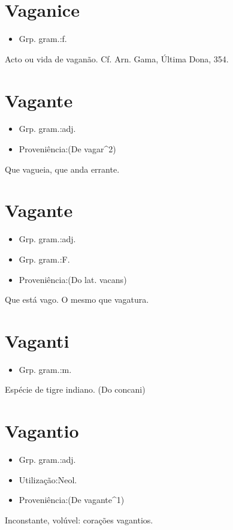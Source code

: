 \documentclass{article}
\begin{document}
\section{Vaganice}
\begin{itemize}
\item {Grp. gram.:f.}
\end{itemize}
Acto ou vida de vaganão. Cf. Arn. Gama, \textunderscore Última Dona\textunderscore , 354.
\section{Vagante}
\begin{itemize}
\item {Grp. gram.:adj.}
\end{itemize}
\begin{itemize}
\item {Proveniência:(De \textunderscore vagar\textunderscore ^2)}
\end{itemize}
Que vagueia, que anda errante.
\section{Vagante}
\begin{itemize}
\item {Grp. gram.:adj.}
\end{itemize}
\begin{itemize}
\item {Grp. gram.:F.}
\end{itemize}
\begin{itemize}
\item {Proveniência:(Do lat. \textunderscore vacans\textunderscore )}
\end{itemize}
Que está vago.
O mesmo que \textunderscore vagatura\textunderscore .
\section{Vaganti}
\begin{itemize}
\item {Grp. gram.:m.}
\end{itemize}
Espécie de tigre indiano.
(Do concani)
\section{Vagantio}
\begin{itemize}
\item {Grp. gram.:adj.}
\end{itemize}
\begin{itemize}
\item {Utilização:Neol.}
\end{itemize}
\begin{itemize}
\item {Proveniência:(De \textunderscore vagante\textunderscore ^1)}
\end{itemize}
Inconstante, volúvel: \textunderscore corações vagantios\textunderscore .
\end{document}
